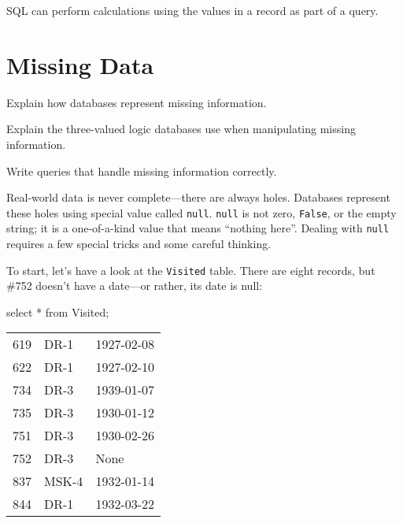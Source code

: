 \documentclass{book}
\begin{document}
\begin{keypoints}
\begin{swcitemize}
\item
  SQL can perform calculations using the values in a record as part of a
  query.
\end{swcitemize}
\end{keypoints}

\section{Missing Data}

\begin{objectives}
\begin{swcitemize}
\item
  Explain how databases represent missing information.
\item
  Explain the three-valued logic databases use when manipulating missing
  information.
\item
  Write queries that handle missing information correctly.
\end{swcitemize}
\end{objectives}

Real-world data is never complete---there are always holes. Databases
represent these holes using special value called \texttt{null}.
\texttt{null} is not zero, \texttt{False}, or the empty string; it is a
one-of-a-kind value that means ``nothing here''. Dealing with
\texttt{null} requires a few special tricks and some careful thinking.

To start, let's have a look at the \texttt{Visited} table. There are
eight records, but \#752 doesn't have a date---or rather, its date is
null:

\begin{VerbIn}
\end{VerbIn}

\begin{VerbIn}
select * from Visited;
\end{VerbIn}

\begin{tabular}{lll}
619 & DR-1 & 1927-02-08 \\
622 & DR-1 & 1927-02-10 \\
734 & DR-3 & 1939-01-07 \\
735 & DR-3 & 1930-01-12 \\
751 & DR-3 & 1930-02-26 \\
752 & DR-3 & None \\
837 & MSK-4 & 1932-01-14 \\
844 & DR-1 & 1932-03-22 \\
\end{tabular}
\end{document}
